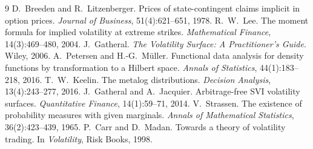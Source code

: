 \documentclass[11pt]{article}
\begin{document}
\begin{thebibliography}{9}
 D.~Breeden and R.~Litzenberger.
Prices of state-contingent claims implicit in option prices.
\emph{Journal of Business}, 51(4):621--651, 1978.
 R.~W.~Lee.
The moment formula for implied volatility at extreme strikes.
\emph{Mathematical Finance}, 14(3):469--480, 2004.
 J.~Gatheral.
\emph{The Volatility Surface: A Practitioner's Guide}. Wiley, 2006.
 A.~Petersen and H.-G.~M\"uller.
Functional data analysis for density functions by transformation to a
Hilbert space.
\emph{Annals of Statistics}, 44(1):183--218, 2016.
 T.~W.~Keelin.
The metalog distributions.
\emph{Decision Analysis}, 13(4):243--277, 2016.
 J.~Gatheral and A.~Jacquier.
Arbitrage-free SVI volatility surfaces.
\emph{Quantitative Finance}, 14(1):59--71, 2014.
 V.~Strassen.
The existence of probability measures with given marginals.
\emph{Annals of Mathematical Statistics}, 36(2):423--439, 1965.
 P.~Carr and D.~Madan.
Towards a theory of volatility trading.
In \emph{Volatility}, Risk Books, 1998.
\end{thebibliography}
\end{document}
